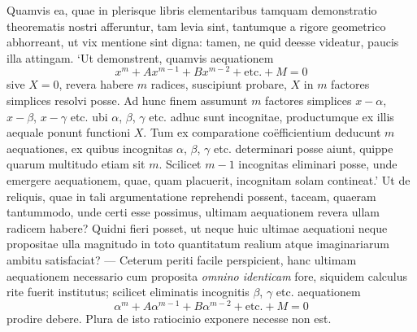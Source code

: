 \documentclass[14pt]{memoir}
\theoremstyle{plain}
\theoremstyle{remark}
\begin{document}
Quamvis ea, quae in plerisque libris elementaribus tamquam demonstratio theorematis nostri afferuntur, tam levia sint, tantumque a rigore geometrico abhorreant, ut vix mentione sint digna: tamen, ne quid deesse videatur, paucis illa attingam. `Ut demonstrent, quamvis aequationem \[x^m + Ax^{m-1} + Bx^{m-2} + \text{etc.} + M = 0\] sive \(X= 0\), revera habere \(m\) radices, suscipiunt probare, \(X\) in \(m\) factores simplices resolvi posse. Ad hunc finem assumunt \(m\) factores simplices \(x-\alpha\), \(x-\beta\), \(x-\gamma\) etc. ubi \(\alpha\), \(\beta\), \(\gamma\) etc. adhuc sunt incognitae, productumque ex illis aequale ponunt functioni \(X\). Tum ex comparatione co\"efficientium deducunt \(m\) aequationes, ex quibus incognitas \(\alpha\), \(\beta\), \(\gamma\) etc. determinari posse aiunt, quippe quarum multitudo etiam sit \(m\). Scilicet \(m-1\) incognitas eliminari posse, unde emergere aequationem, quae, quam placuerit, incognitam solam contineat.'  Ut de reliquis, quae in tali argumentatione reprehendi possent, taceam, quaeram tantummodo, unde certi esse possimus, ultimam aequationem revera ullam radicem habere? Quidni fieri posset, ut neque huic ultimae aequationi neque propositae ulla magnitudo in toto quantitatum realium atque imaginariarum ambitu satisfaciat? — Ceterum periti facile perspicient, hanc ultimam aequationem necessario cum proposita \textit{omnino identicam} fore, siquidem calculus rite fuerit institutus; scilicet eliminatis incognitis \(\beta\), \(\gamma\) etc. aequationem \[ \alpha^m + A\alpha^{m-1} + B\alpha^{m-2} + \text{etc.} + M = 0 \] prodire debere.  Plura de isto ratiocinio exponere necesse non est.
\end{document}

